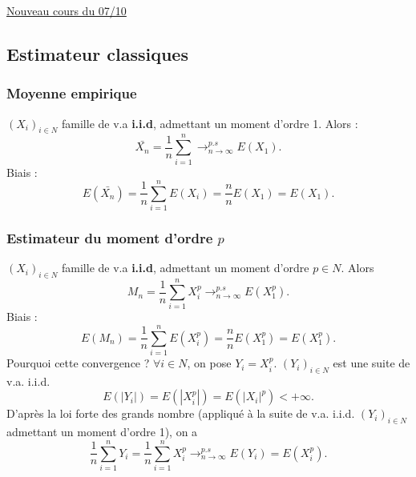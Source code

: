 \documentclass{article}
\theoremstyle{plain}%
\theoremstyle{definition}
\theoremstyle{remark}
\begin{document}
\underline{Nouveau cours du 07/10} \\
\subsection{Estimateur classiques}
\subsubsection{Moyenne empirique}

$ (X_i)_{i \in N} $ famille de v.a \textbf{i.i.d}, admettant un moment d'ordre 1. Alors : 
\[
    \bar{X_n} = \frac{1}{n}\sum_{i=1}^{n} \to ^{p.s}_{n \to \infty } E(X_1)
.\]
Biais : 
\[
    E(\bar{X_n}) = \frac{1}{n}\sum_{i=1}^{n}E(X_i) = \frac{n}{n}E(X_1) = E(X_1)
.\]

\subsubsection{Estimateur du moment d'ordre $ p $ }
$ (X_i)_{i \in N} $ famille de v.a \textbf{i.i.d}, admettant un moment d'ordre $ p \in N $. Alors 
\[
    M_n = \frac{1}{n}\sum_{i=1}^{n}X_i^p \to ^{p.s}_{n \to \infty } E(X_1^p)
.\]
Biais : 
\[
    E(M_n) = \frac{1}{n}\sum_{i=1}^{n}E(X_i^p) = \frac{n}{n}E(X_1^p) = E(X_1^p)
.\]
Pourquoi cette convergence ? $ \forall i \in N $, on pose $ Y_i = X_i^p $. $ (Y_i)_{i \in N} $ est une suite de v.a. i.i.d. 
\[
    E(\left| Y_i \right| ) = E(\left| X_i^p \right| ) = E(\left| X_i \right| ^p) < +\infty 
.\]
D'après la loi forte des grands nombre (appliqué à la suite de v.a. i.i.d. $ (Y_i)_{i \in N} $ admettant un moment d'ordre 1), on a 
\[
    \frac{1}{n}\sum_{i=1}^{n}Y_i = \frac{1}{n}\sum_{i=1}^{n}X_i^p \to ^{p.s}_{n \to \infty } E(Y_i) = E(X_i^p)
.\]
\end{document}
